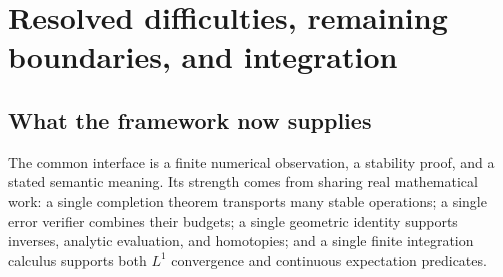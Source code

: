 \section{Resolved difficulties, remaining boundaries, and integration}\label{sec:synthesis}

\subsection{What the framework now supplies}

The common interface is a finite numerical observation, a stability proof, and a stated semantic meaning. Its strength comes from sharing real mathematical work: a single completion theorem transports many stable operations; a single error verifier combines their budgets; a single geometric identity supports inverses, analytic evaluation, and homotopies; and a single finite integration calculus supports both $L^1$ convergence and continuous expectation predicates.

